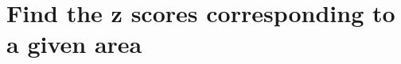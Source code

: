 \documentclass[t]{beamer}
\begin{document}

\section{Find the z scores corresponding to a given area}
\end{document}
